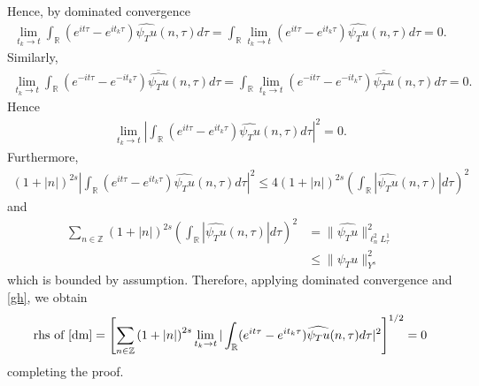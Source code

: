 \documentclass[12pt,reqno]{amsart}
\numberwithin{equation}{section}  %
\numberwithin{figure}{section}
\newcommand{\rr}{\mathbb{R}}
\newcommand{\zz}{\mathbb{Z}}
\newcommand{\wh}{\widehat}
\theoremstyle{plain}
\theoremstyle{definition}
\theoremstyle{remark}
\begin{document}
%
%
Hence, by dominated convergence
%
%
\begin{equation*}
\begin{split}
\lim_{t_{k} \to t}  \int_{\rr} (e^{it \tau} - e^{it_{k} \tau})
    \wh{\psi_{T} u}(n,
    \tau) d \tau =  \int_{\rr} \lim_{t_{k} \to t} (e^{it \tau} - e^{it_{k} \tau})
    \wh{\psi_{T} u}(n,
    \tau) d \tau = 0. 
\end{split}
\end{equation*}
%
%
Similarly, 
%
%
%
\begin{equation*}
\begin{split}
\lim_{t_{k} \to t} \int_{\rr} (e^{-it \tau} - e^{-it_{k} \tau})
    \overline{\wh{\psi_{T} u}}(n,
    \tau) d \tau  =\int_{\rr}  \lim_{t_{k} \to t} (e^{-it \tau} - e^{-it_{k} \tau})
    \overline{\wh{\psi_{T} u}}(n,
    \tau) d \tau  = 0.
\end{split}
\end{equation*}
%
%
Hence
%
%
%
\begin{equation}
  \label{gh}
\begin{split}
  \lim_{t_{k} \to t} | \int_{\rr} (e^{it \tau} - e^{it_{k} \tau})
    \wh{\psi_{T} u}(n,
		\tau) d \tau |^2 = 0.
\end{split}
\end{equation}
%
%
		Furthermore,
    \begin{equation*}
    \begin{split}
      (1 + | n |)^{2s} | \int_{\rr} \left( e^{it\tau} - e^{it_{k} \tau} \right)
      \wh{\psi_{T}u}(n, \tau) d \tau|^{2} \le 4 (1 + | n |)^{2s} \left(
      \int_{\rr} | \wh{\psi_{T} u}(n, \tau)  | d \tau
      \right)^{2}
    \end{split}
    \end{equation*}
    and
		\begin{equation*}
			\begin{split}
         \sum_{n \in \zz}  \left( 1 + | n |
        \right)^{2s} \left ( \int_{\rr} |\wh{\psi_{T} u}(n, \tau)| d \tau
        \right )^2  
        & = \|\wh{\psi_{T} u}\|_{\ell^{2}_{n}L^{1}_{\tau}}^2
		\\
		& \le \|\psi_{T} u \|_{Y^s}^2 
	\end{split}
\end{equation*}
which is bounded by assumption. Therefore, applying dominated convergence and
\eqref{gh}, we
obtain 
%
%
\begin{equation*}
\begin{split}
  \text{rhs of \eqref{dm}} = \left[ \sum_{n \in \zz} \left( 1 + | n |
    \right)^{2s} \lim_{t_{k} \to t} | \int_{\rr} (e^{it \tau} - e^{it_{k} \tau})
    \wh{\psi_{T} u}(n,
		\tau) d \tau |^2 \right]^{1/2} = 0
\end{split}
\end{equation*}
%
%
completing the proof. \qquad \qedsymbol
%
%
\end{document}
